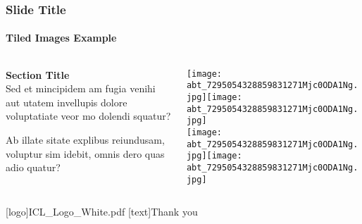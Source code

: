 \documentclass[
	aspectratio=169, %
	t, %
	onlytextwidth, %
	10pt, %
]{beamer}
\begin{document}

\begin{frame}
	\frametitle{Slide Title}
	\framesubtitle{Tiled Images Example}
	
	\small %
	
	\begin{columns}[T] %
		\begin{column}{0.3\linewidth} %
			\textbf{Section Title}\\
			Sed et mincipidem am fugia venihi aut utatem invellupis dolore voluptatiate veor mo dolendi squatur?

			Ab illate sitate explibus reiundusam, voluptur sim idebit, omnis dero quas adio quatur?
		\end{column}
		\begin{column}{0.68\linewidth} %
			\vspace{-3.5\baselineskip} %
			
			\texttt{[image: abt\_7295054328859831271Mjc0ODA1Ng.jpg]}\hfill\texttt{[image: abt\_7295054328859831271Mjc0ODA1Ng.jpg]}\\[4pt]
			\texttt{[image: abt\_7295054328859831271Mjc0ODA1Ng.jpg]}\hfill\texttt{[image: abt\_7295054328859831271Mjc0ODA1Ng.jpg]}\par
		\end{column}
	\end{columns}
\end{frame}





\begingroup
	[logo]{ICL_Logo_White.pdf} %
	[text]{Thank you} %
	
\endgroup
\end{document}
